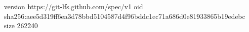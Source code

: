 version https://git-lfs.github.com/spec/v1
oid sha256:aee5d319ff6ea3d78bbd5104587d4f96bddc1ec71a686d0e81933865b19edebc
size 262240
